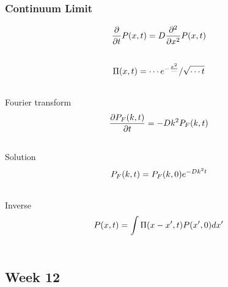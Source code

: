 \documentclass[letterpaper,10pt,english]{sphinxmanual}
\begin{document}
\subsubsection{Continuum Limit}
\label{nonequilibrium/week11:id1}\begin{gather}
\begin{split}\frac{\partial}{\partial t}P(x,t) = D\frac{\partial^2}{\partial x^2} P(x,t)\end{split}\notag\\\begin{split}\end{split}\notag
\end{gather}\begin{gather}
\begin{split}\Pi(x,t) = \cdots e^{-\frac{x^2}{\cdots}}/\sqrt{\cdots t}\end{split}\notag\\\begin{split}\end{split}\notag
\end{gather}
Fourier transform
\begin{gather}
\begin{split}\frac{\partial P_F(k,t)}{\partial t} = - D k^2 P_F(k,t)\end{split}\notag\\\begin{split}\end{split}\notag
\end{gather}
Solution
\begin{gather}
\begin{split}P_F(k,t) = P_F(k,0) e^{-Dk^2t}\end{split}\notag\\\begin{split}\end{split}\notag
\end{gather}
Inverse
\begin{gather}
\begin{split}P(x,t) = \int \Pi(x-x',t) P(x',0) dx'\end{split}\notag\\\begin{split}\end{split}\notag
\end{gather}

\subsection{Week 12}
\label{nonequilibrium/week12:week-12}\label{nonequilibrium/week12::doc}
\end{document}
